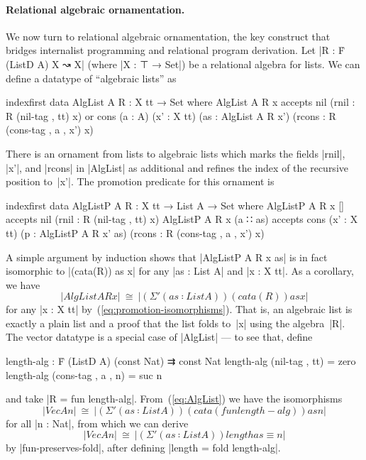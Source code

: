 \paragraph{Relational algebraic ornamentation.}
We now turn to relational algebraic ornamentation, the key construct that bridges internalist programming and relational program derivation.
Let |R : Ḟ (ListD A) X ↝ X| (where |X : ⊤ → Set|) be a relational algebra for lists.
We can define a datatype of ``algebraic lists'' as
\begin{code}
indexfirst data AlgList A R : X tt → Set where
  AlgList A R x  accepts  nil (rnil : R (nil-tag , tt) x)
                 or       cons  (a : A) (x' : X tt) (as : AlgList A R x')
                                (rcons : R (cons-tag , a , x') x)
\end{code}
There is an ornament from lists to algebraic lists which marks the fields |rnil|, |x'|, and |rcons| in |AlgList| as additional and refines the index of the recursive position to~|x'|.
The promotion predicate for this ornament is
\begin{code}
indexfirst data AlgListP A R : X tt → List A → Set where
  AlgListP A R x []        accepts  nil (rnil : R (nil-tag , tt) x)
  AlgListP A R x (a ∷ as)  accepts  cons  (x' : X tt)
                                          (p : AlgListP A R x' as)
                                          (rcons : R (cons-tag , a , x') x)
\end{code}
A simple argument by induction shows that |AlgListP A R x as| is in fact isomorphic to |(cata(R)) as x| for any |as : List A| and |x : X tt|.
As a corollary, we have
\begin{equation}
|AlgList A R x| ~\cong~ |(Σ'(as ∶ List A)) (cata(R)) as x|
\label{eq:AlgList}
\end{equation}
for any |x : X tt| by~(\ref{eq:promotion-isomorphisms}).
That is, an algebraic list is exactly a plain list and a proof that the list folds to~|x| using the algebra~|R|.
The vector datatype is a special case of |AlgList| --- to see that, define
\begin{code}
length-alg :  Ḟ (ListD A) (const Nat) ⇉ const Nat
length-alg (nil-tag   , tt)     =  zero
length-alg (cons-tag  , a , n)  =  suc n
\end{code}
and take |R = fun length-alg|.
From~(\ref{eq:AlgList}) we have the isomorphisms
\[ |Vec A n| ~\cong~ |(Σ'(as ∶ List A)) (cata(fun length-alg)) as n| \]
for all |n : Nat|, from which we can derive
\[ |Vec A n| ~\cong~ |(Σ'(as ∶ List A)) length as ≡ n| \]
by |fun-preserves-fold|, after defining |length = fold length-alg|.


